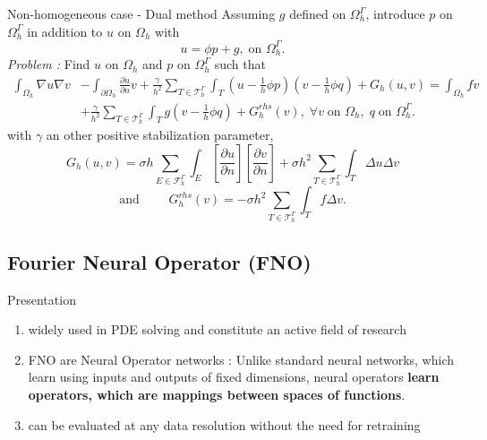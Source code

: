 \documentclass[compress,10pt,xcolor={table,dvipsnames},t]{beamer}
\begin{document}
	\begin{frame}{Non-homogeneous case - Dual method}
		\small
		Assuming $g$ defined on $\Omega_h^\Gamma$, introduce $p$ on $\Omega_h^\Gamma$ in addition to $u$ on $\Omega_h$ with
		\begin{equation*}
			u=\phi p+g, \; \text{on } \Omega_h^\Gamma.
		\end{equation*}
		\textit{Problem :} Find $u$ on $\Omega_h$ and $p$ on $\Omega_h^\Gamma$ such that
		\begin{align*}
			\int_{\Omega_h}\nabla u\nabla v&-\int_{\partial\Omega_h}\frac{\partial u}{\partial n} v + \frac{\gamma}{h^2} \sum_{T\in\mathcal{T}_h^\Gamma}\int_T \left(u-\frac{1}{h}\phi p\right)\left(v-\frac{1}{h}\phi q\right) + G_h(u,v) = \int_{\Omega_h}fv \\
			&+ \frac{\gamma}{h^2} \sum_{T\in\mathcal{T}_h^\Gamma}\int_T g\left(v-\frac{1}{h}\phi q\right) + G_h^{rhs}(v), \; \forall v \; \text{on } \Omega_h, \; q \; \text{on } \Omega_h^\Gamma.
		\end{align*}
		with $\gamma$ an other positive stabilization parameter,
		\begin{equation*}
			G_h(u,v)=\sigma h\sum_{E\in\mathcal{F}_h^\Gamma}\int_E\left[\frac{\partial u}{\partial n}\right]\left[\frac{\partial v}{\partial n}\right]+\sigma h^2\sum_{T\in\mathcal{T}_h^\Gamma}\int_T \Delta u\Delta v
		\end{equation*}
		\begin{equation*}
			\text{and } \qquad G_h^{rhs}(v)=-\sigma h^2\sum_{T\in\mathcal{T}_h^\Gamma}\int_T f\Delta v.
		\end{equation*}
	\end{frame}

	\subsection{Fourier Neural Operator (FNO)}
	
	\begin{frame}{Presentation}
		\begin{enumerate}[\ding{217}]
			\item widely used in PDE solving and constitute an active field of research
			\item FNO are Neural Operator networks : Unlike standard neural networks, which learn using inputs and outputs of fixed dimensions, neural operators \textbf{learn operators, which are mappings between spaces of functions}. \item can be evaluated at any data resolution without the need for retraining
		\end{enumerate}
	\end{frame}
\end{document}
